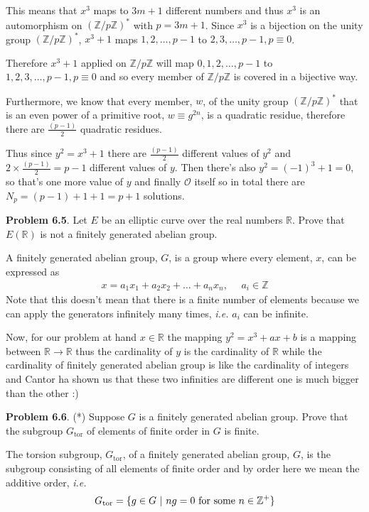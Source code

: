 \documentclass[aps,preprint,preprintnumbers,nofootinbib,showpacs,prd]{revtex4-1}
\newcommand{\ie}{{\it i.e.} }
\newcommand{\nbea}{\begin{eqnarray*}}
\newcommand{\neea}{\end{eqnarray*}}
\DeclareMathOperator{\tor}{tor}
\begin{document}
This means that $x^3$ maps to $3m+1$ different numbers and thus $x^3$ is an automorphism on $(\mathbb{Z}/p\mathbb{Z})^*$ with $p = 3m + 1$. Since $x^3$ is a bijection on the unity group $(\mathbb{Z}/p\mathbb{Z})^*$, $x^3 + 1$ maps $1, 2, \dots, p-1$ to $2, 3, \dots, p-1, p \equiv 0$.

Therefore $x^3 + 1$ applied on $\mathbb{Z}/p\mathbb{Z}$ will map $0, 1, 2, \dots, p-1$ to $1, 2, 3, \dots, p-1, p \equiv 0$ and so every member of $\mathbb{Z}/p\mathbb{Z}$ is covered in a bijective way.

Furthermore, we know that every member, $w$, of the unity group $(\mathbb{Z}/p\mathbb{Z})^*$ that is an even power of a primitive root, $w \equiv g^{2n}$, is a quadratic residue, therefore there are $\frac{(p-1)}{2}$ quadratic residues.

Thus since $y^2 = x^3 + 1$ there are $\frac{(p-1)}{2}$ different values of $y^2$ and $2 \times \frac{(p-1)}{2} = p-1$ different values of $y$. Then there's also $y^2 = (-1)^3 + 1 = 0$, so that's one more value of $y$ and finally $\mathcal{O}$ itself so in total there are $N_p = (p - 1) + 1 + 1 = p + 1$ solutions.

{\bf Problem 6.5}. Let $E$ be an elliptic curve over the real numbers $\mathbb{R}$. Prove that $E(\mathbb{R})$ is not a finitely generated abelian group.

A finitely generated abelian group, $G$, is a group where every element, $x$, can be expressed as
%
\nbea
x = a_1x_1 + a_2x_2 + \ldots + a_nx_n, ~~~~~~ a_i \in \mathbb{Z}
\neea
%
Note that this doesn't mean that there is a finite number of elements because we can apply the generators infinitely many times, \ie $a_i$ can be infinite.

Now, for our problem at hand $x \in \mathbb{R}$ the mapping $y^2 = x^3 + ax+b$ is a mapping between $\mathbb{R} \to \mathbb{R}$ thus the cardinality of $y$ is the cardinality of $\mathbb{R}$ while the cardinality of finitely generated abelian group is like the cardinality of integers and Cantor ha shown us that these two infinities are different one is much bigger than the other :)

{\bf Problem 6.6}. (*) Suppose $G$ is a finitely generated abelian group. Prove that the subgroup $G_{\tor}$ of elements of finite order in $G$ is finite.

The torsion subgroup, $G_{\tor}$, of a finitely generated abelian group, $G$, is the subgroup consisting of all elements of finite order and by order here we mean the additive order, \ie
%
\nbea
G_{\tor} = \{g \in G ~|~ ng = 0 {\rm~for~some~} n \in \mathbb{Z}^+\}
\neea
%
\end{document}
